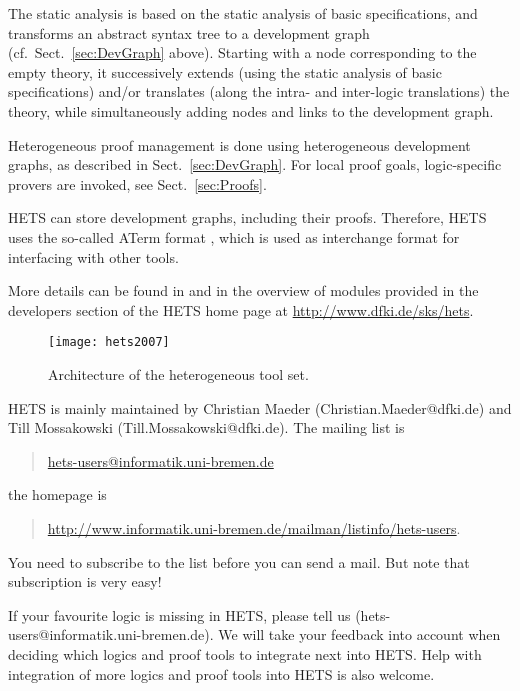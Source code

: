 \documentclass{article}
\newcommand{\normalTEXTSC}[2]{{#1\scriptsize#2}}
\newcommand     {\Hets}{\normalTEXTSC{H}{ETS}\xspace}
\begin{document}
The static analysis is based on the static analysis of basic
specifications, and transforms an abstract syntax tree to a
development graph (cf.\ Sect.~\ref{sec:DevGraph} above).  Starting with a
node corresponding to the empty theory, it successively extends (using
the static analysis of basic specifications) and/or translates (along
the intra- and inter-logic translations) the theory, while
simultaneously adding nodes and links to the development graph.

Heterogeneous proof management is done using heterogeneous
development graphs, as described in Sect.~\ref{sec:DevGraph}.
For local proof goals, logic-specific provers are invoked,
see Sect.~\ref{sec:Proofs}.

\Hets can store development graphs, including their proofs.
Therefore, \Hets uses the so-called
ATerm format \cite{BJKO00}, which is used as interchange format
for interfacing with other tools.

More details can be found in \cite{Habil,MossakowskiEtAl07b}
and in the overview of modules provided in the developers section
of the \Hets home page at \url{http://www.dfki.de/sks/hets}.

\begin{figure}
\begin{center}
\texttt{[image: hets2007]}
\end{center}
%
\caption{Architecture of the heterogeneous tool set.
\label{fig:hets}}
\end{figure}

\bigskip

\Hets is mainly maintained by
Christian Maeder (Christian.Maeder@dfki.de) and Till Mossakowski
(Till.Mossakowski@dfki.de). The mailing list is
\begin{quote}
 \url{hets-users@informatik.uni-bremen.de}
\end{quote}
the homepage is
\begin{quote}
\url{http://www.informatik.uni-bremen.de/mailman/listinfo/hets-users}.
\end{quote}

You need to subscribe to the list before you can send a mail.
But note that subscription is very easy!

If your favourite logic is missing in \Hets, please tell us
(hets-users@informatik.uni-bremen.de). We will take your feedback into account
when deciding which logics and proof tools to integrate next into \Hets. Help
with integration of more logics and proof tools into \Hets is also welcome.
\end{document}
